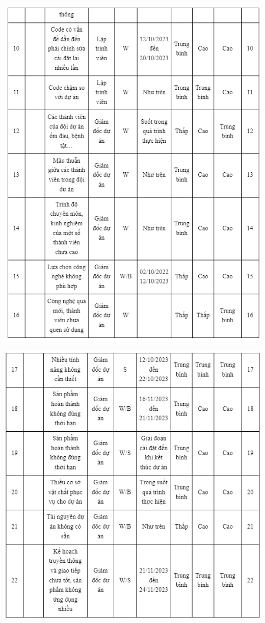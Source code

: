\documentclass[12pt]{article}
\begin{document}
\par
\hspace{-2.6cm}\includegraphics[width=19cm]{II_7_4_3.png}
\par
\hspace{-2.6cm}\includegraphics[width=19cm]{II_7_4_4.png}
\vspace{0.5cm}
\end{document}
